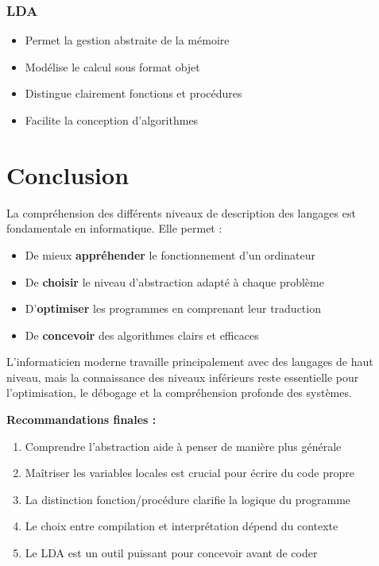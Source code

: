 \documentclass[12pt,a4paper]{article}
\begin{document}
\subsubsection{LDA}

\begin{astuce}
\begin{itemize}
    \item Permet la gestion abstraite de la mémoire
    \item Modélise le calcul sous format objet
    \item Distingue clairement fonctions et procédures
    \item Facilite la conception d'algorithmes
\end{itemize}
\end{astuce}

\newpage
\section{Conclusion}

\begin{important}
La compréhension des différents niveaux de description des langages est fondamentale en informatique. Elle permet : 
\begin{itemize}
    \item De mieux \textcolor{titrebleu}{\textbf{appréhender}} le fonctionnement d'un ordinateur
    \item De \textcolor{defvert}{\textbf{choisir}} le niveau d'abstraction adapté à chaque problème
    \item D'\textcolor{algoviolet}{\textbf{optimiser}} les programmes en comprenant leur traduction
    \item De \textcolor{exempleorange}{\textbf{concevoir}} des algorithmes clairs et efficaces
\end{itemize}
\end{important}

\begin{astuce}
L'informaticien moderne travaille principalement avec des langages de haut niveau, mais la connaissance des niveaux inférieurs reste essentielle pour l'optimisation, le débogage et la compréhension profonde des systèmes.
\end{astuce}

\begin{notecours}
\textbf{Recommandations finales :}

\begin{enumerate}
    \item Comprendre l'abstraction aide à penser de manière plus générale
    \item Maîtriser les variables locales est crucial pour écrire du code propre
    \item La distinction fonction/procédure clarifie la logique du programme
    \item Le choix entre compilation et interprétation dépend du contexte
    \item Le LDA est un outil puissant pour concevoir avant de coder
\end{enumerate}
\end{notecours}
\end{document}
